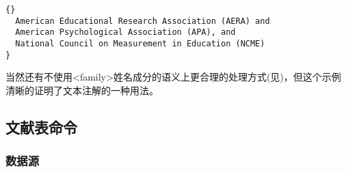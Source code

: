 \begin{lstlisting}[style=bibtex]{}
  American Educational Research Association (AERA) and
  American Psychological Association (APA), and
  National Council on Measurement in Education (NCME)
}
\end{lstlisting}
%


当然还有不使用<family>姓名成分的语义上更合理的处理方式(见)，但这个示例清晰的证明了文本注解的一种用法。

\subsection{文献表命令}
\label{use:bib}

\subsubsection{数据源}%
\label{use:bib:res}

